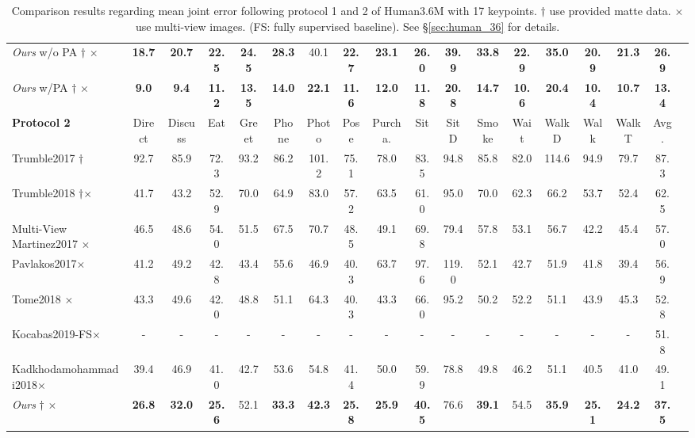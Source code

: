 \documentclass[10pt,twocolumn,letterpaper]{article}
\begin{document}
\begin{table*}
\begin{center}
{\begin{tabular}{ l c c c c c c c c c c c c c c c c c}
\emph{Ours} w/o PA $\dagger$ $\times$& \textbf{18.7}&\textbf{20.7}&\textbf{22.5}&\textbf{24.5}&\textbf{28.3}&40.1&\textbf{22.7}&\textbf{23.1}&\textbf{26.0}&\textbf{39.9}&\textbf{33.8}&\textbf{22.9}&\textbf{35.0}& \textbf{20.9} &\textbf{21.3}&\textbf{26.9}  \\
\emph{Ours} w/PA $\dagger$ $\times$& \textbf{9.0}&\textbf{9.4}&\textbf{11.2}&\textbf{13.5}&\textbf{14.0}&\textbf{22.1}&\textbf{11.6}&\textbf{12.0}&\textbf{11.8}&\textbf{20.8}&\textbf{14.7}&\textbf{10.6}&\textbf{20.4}&\textbf{10.4}& \textbf{10.7} &\textbf{13.4}  \\
\hline
\textbf{Protocol 2} & Direct & Discuss & Eat & Greet & Phone& Photo & Pose  & Purcha. & Sit & SitD &Smoke &Wait &WalkD&Walk& WalkT & Avg.\\
\hline
Trumble2017  \cite{trumble2017total} $\dagger$& 92.7 & 85.9 & 72.3 & 93.2 & 86.2 & 101.2 & 75.1 & 78.0 & 83.5&94.8 & 85.8& 82.0 & 114.6 & 94.9 & 79.7& 87.3 \\ 
Trumble2018   \cite{trumble2018deep}  $\dagger$$\times$& 41.7 & 43.2 & 52.9 & 70.0 & 64.9 & 83.0 & 57.2 & 63.5 & 61.0 & 95.0 & 70.0 & 62.3 & 66.2 & 53.7 & 52.4 & 62.5  \\
Multi-View Martinez2017 \cite{martinez2017}\cite{tome2018rethinking}$\times$ &46.5 &48.6 &54.0 &51.5 &67.5 &70.7 &48.5 &49.1 &69.8 &79.4 &57.8 &53.1 &56.7 &42.2 &45.4 &57.0 \\
Pavlakos2017\cite{PavlakosZDD17}$\times$ & 41.2 &49.2 &42.8 &43.4 &55.6 &46.9 &40.3 &63.7 &97.6 &119.0 &52.1 &42.7 &51.9 &41.8 &39.4 &56.9\\
Tome2018 \cite{tome2018rethinking}$\times$ &43.3 &49.6 &42.0 &48.8 &51.1 &64.3 &40.3 &43.3 &66.0 &95.2 &50.2 &52.2 &51.1 &43.9 &45.3 &52.8\\
Kocabas2019-FS\cite{kocabas2019self}$\times$&-&-&-&-&-&-&-&-&-&-&-&-&-&-&-&51.8\\
Kadkhodamohammadi2018\cite{Abdolrahim2018}$\times$ &39.4 &46.9 &41.0 &42.7& 53.6 &54.8 &41.4& 50.0 &59.9 &78.8 &49.8 &46.2 &51.1 &40.5 &41.0 &49.1\\
\emph{Ours} $\dagger$ $\times$ &\textbf{26.8} &\textbf{32.0} &\textbf{25.6} &52.1 &\textbf{33.3} &\textbf{42.3} &\textbf{25.8}& \textbf{25.9} &\textbf{40.5} &76.6 &\textbf{39.1} &54.5 &\textbf{35.9} &\textbf{25.1} &\textbf{24.2} &\textbf{37.5}\\


\hline
\end{tabular}}
\end{center}
\caption{Comparison results regarding mean joint error following protocol 1 and 2 of Human3.6M with 17 keypoints. $\dagger$ use provided matte data. $\times$ use multi-view images. (FS: fully supervised baseline). See \S\ref{sec:human_36} for details.}
\label{tab:human}
\vspace*{-14pt}
\end{table*}
\end{document}
